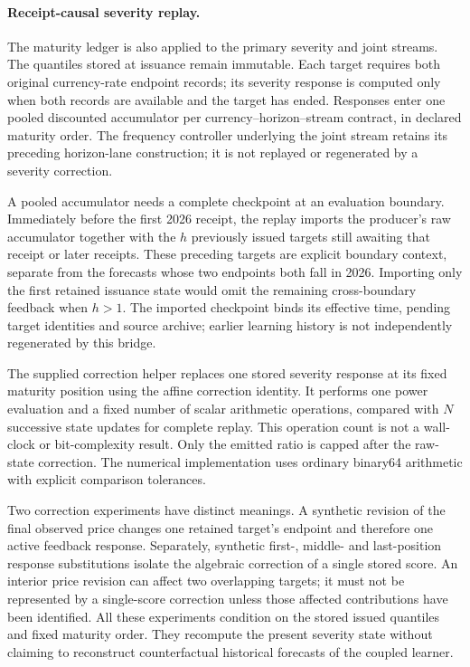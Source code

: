 \documentclass[11pt,a4paper]{article}
\theoremstyle{definition}\newtheorem{definition}[theorem]{Definition}
\begin{document}
\paragraph{Receipt-causal severity replay.}
The maturity ledger is also applied to the primary severity and joint streams. The quantiles stored at issuance remain immutable. Each target requires both original currency-rate endpoint records; its severity response is computed only when both records are available and the target has ended. Responses enter one pooled discounted accumulator per currency--horizon--stream contract, in declared maturity order. The frequency controller underlying the joint stream retains its preceding horizon-lane construction; it is not replayed or regenerated by a severity correction.

A pooled accumulator needs a complete checkpoint at an evaluation boundary. Immediately before the first 2026 receipt, the replay imports the producer's raw accumulator together with the $h$ previously issued targets still awaiting that receipt or later receipts. These preceding targets are explicit boundary context, separate from the forecasts whose two endpoints both fall in 2026. Importing only the first retained issuance state would omit the remaining cross-boundary feedback when $h>1$. The imported checkpoint binds its effective time, pending target identities and source archive; earlier learning history is not independently regenerated by this bridge.

The supplied correction helper replaces one stored severity response at its fixed maturity position using the affine correction identity. It performs one power evaluation and a fixed number of scalar arithmetic operations, compared with $N$ successive state updates for complete replay. This operation count is not a wall-clock or bit-complexity result. Only the emitted ratio is capped after the raw-state correction. The numerical implementation uses ordinary binary64 arithmetic with explicit comparison tolerances.

Two correction experiments have distinct meanings. A synthetic revision of the final observed price changes one retained target's endpoint and therefore one active feedback response. Separately, synthetic first-, middle- and last-position response substitutions isolate the algebraic correction of a single stored score. An interior price revision can affect two overlapping targets; it must not be represented by a single-score correction unless those affected contributions have been identified. All these experiments condition on the stored issued quantiles and fixed maturity order. They recompute the present severity state without claiming to reconstruct counterfactual historical forecasts of the coupled learner.
\end{document}
